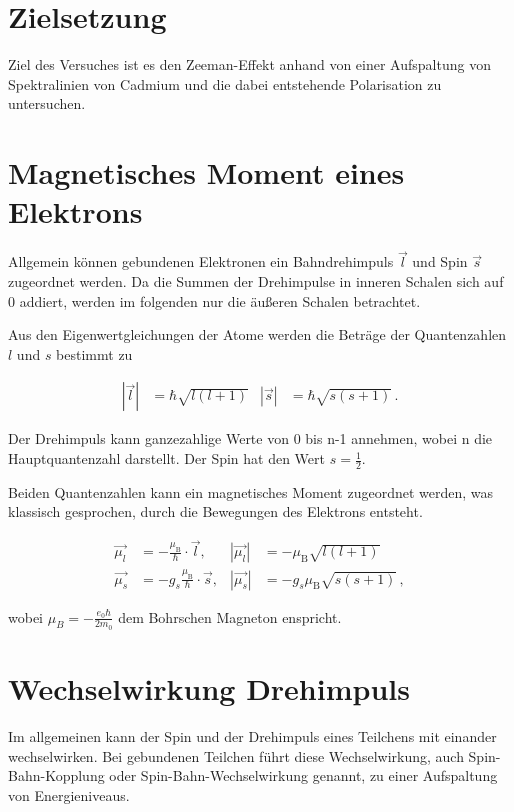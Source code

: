 \section{Zielsetzung}
Ziel des Versuches ist es den Zeeman-Effekt anhand von einer Aufspaltung von Spektralinien von Cadmium und die dabei entstehende Polarisation zu untersuchen.

\section{Magnetisches Moment eines Elektrons}
Allgemein können gebundenen Elektronen ein Bahndrehimpuls $\vec{l}$ und Spin $\vec{s}$ zugeordnet werden. Da die Summen der Drehimpulse in inneren Schalen sich auf 0 addiert, werden
im folgenden nur die äußeren Schalen betrachtet. 

\noindent
Aus den Eigenwertgleichungen der Atome werden die Beträge der Quantenzahlen $l$ und $s$ bestimmt zu 

\vspace{-25pt}
\begin{align}
    |\vec{l}| &= \hbar \sqrt{l(l+1)} & |\vec{s}| &= \hbar \sqrt{s(s+1)} \, .
\end{align}

\noindent
Der Drehimpuls kann ganzezahlige Werte von 0 bis n-1 annehmen, wobei n die Hauptquantenzahl darstellt. Der Spin hat den Wert $s=\frac{1}{2}$. 

\noindent
Beiden Quantenzahlen kann ein magnetisches Moment zugeordnet werden, was klassisch gesprochen, durch die Bewegungen des Elektrons entsteht. 

\vspace{-15pt}
\begin{align}
    \vec{\mu_l} &= - \frac{\mu_\text{B}}{\hbar} \cdot \vec{l}, & |\vec{\mu_l}|& = - \mu_\text{B} \sqrt{l(l+1)}\\
    \vec{\mu_s} &= - g_s \frac{\mu_\text{B}}{\hbar} \cdot \vec{s}, & |\vec{\mu_s}| &= - g_s \mu_\text{B} \sqrt{s(s+1)} \, ,
\end{align}

\noindent
wobei $\mu_B = -\frac{e_0 \hbar}{2 m_0}$ dem Bohrschen Magneton enspricht. 

\section{Wechselwirkung Drehimpuls}
Im allgemeinen kann der Spin und der Drehimpuls eines Teilchens mit einander wechselwirken. Bei gebundenen Teilchen führt 
diese Wechselwirkung, auch Spin-Bahn-Kopplung oder Spin-Bahn-Wechselwirkung genannt, zu einer Aufspaltung von Energieniveaus.

